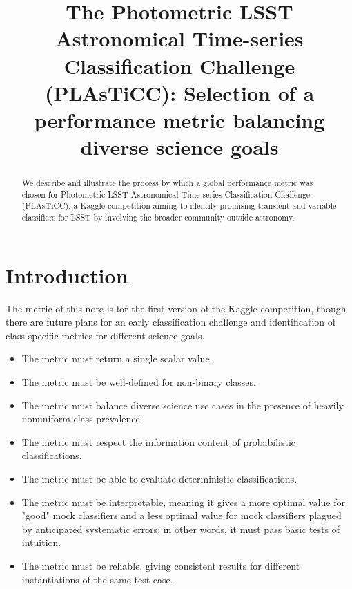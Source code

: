 \documentclass[\docopts]{\docclass}
\begin{document}
\title{The Photometric LSST Astronomical Time-series Classification Challenge (PLAsTiCC): Selection of a performance metric balancing diverse science goals}

\maketitlepre

\begin{abstract}

  We describe and illustrate the process by which a global performance metric was chosen for Photometric LSST Astronomical Time-series Classification Challenge (PLAsTiCC), a Kaggle competition aiming to identify promising transient and variable classifiers for LSST by involving the broader community outside astronomy.

\end{abstract}

\dockeys{}

\maketitlepost


\section{Introduction}
\label{sec:intro}

The metric of this note is for the first version of the Kaggle competition, though there are future plans for an early classification challenge and identification of class-specific metrics for different science goals.

\begin{itemize}
\item    The metric must return a single scalar value.
\item    The metric must be well-defined for non-binary classes.
\item    The metric must balance diverse science use cases in the presence of heavily nonuniform class prevalence.
\item    The metric must respect the information content of probabilistic classifications.
\item    The metric must be able to evaluate deterministic classifications.
\item    The metric must be interpretable, meaning it gives a more optimal value for "good" mock classifiers and a less optimal value for mock classifiers plagued by anticipated systematic errors; in other words, it must pass basic tests of intuition.
\item    The metric must be reliable, giving consistent results for different instantiations of the same test case.
\end{itemize}
\end{document}
